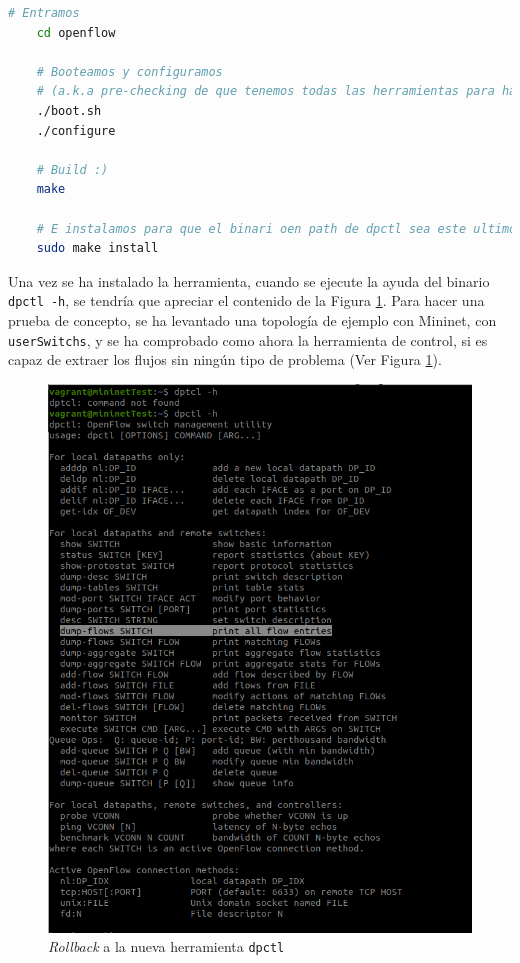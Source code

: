 \begin{lstlisting}[language= bash, style=Consola, caption={Construcción de la nueva versión de dpctl},label=code:dpctlold2]
    # Entramos
    cd openflow

    # Booteamos y configuramos 
    # (a.k.a pre-checking de que tenemos todas las herramientas para hacer el make)
    ./boot.sh
    ./configure

    # Build :)
    make

    # E instalamos para que el binari oen path de dpctl sea este ultimo
    sudo make install
\end{lstlisting}
\vspace{0.5cm}


Una vez se ha instalado la herramienta, cuando se ejecute la ayuda del binario \texttt{dpctl -h}, se tendría que apreciar el contenido de la Figura \ref{fig:dpctl_5}. Para hacer una prueba de concepto, se ha levantado una topología de ejemplo con Mininet, con \texttt{userSwitchs}, y se ha comprobado como ahora la herramienta de control, si es capaz de extraer los flujos sin ningún tipo de problema (Ver Figura \ref{fig:dpctl_5}).
\newpage

\begin{figure}[ht!]
    \centering
    \includegraphics[width=\textwidth]{archivos/img/dev/dpctl_5.png}
    \caption{\textit{Rollback} a la nueva herramienta \texttt{dpctl}}
    \label{fig:dpctl_5}
\end{figure}

